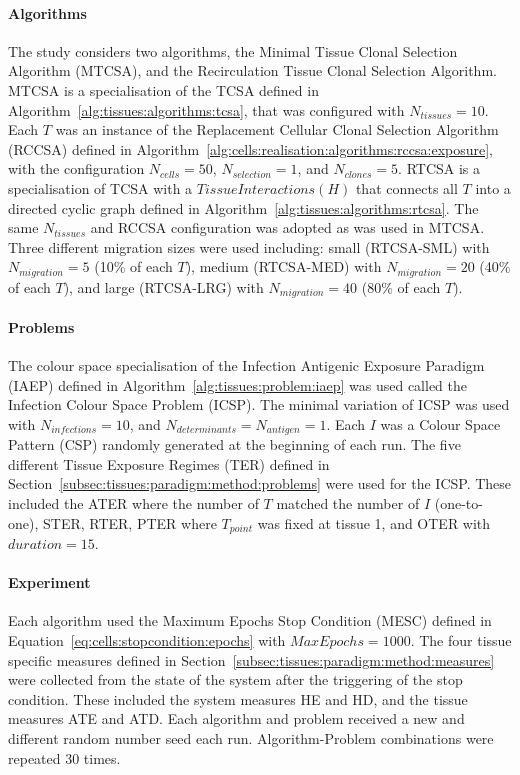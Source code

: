 \paragraph{Algorithms}
The study considers two algorithms, the Minimal Tissue Clonal Selection Algorithm (MTCSA), and the Recirculation Tissue Clonal Selection Algorithm. 
MTCSA is a specialisation of the TCSA defined in Algorithm~\ref{alg:tissues:algorithms:tcsa}, that was configured with $N_{tissues}=10$. Each $T$ was an instance of the Replacement Cellular Clonal Selection Algorithm (RCCSA) defined in Algorithm~\ref{alg:cells:realisation:algorithms:rccsa:exposure}, with the configuration $N_{cells}=50$, $N_{selection}=1$, and $N_{clones}=5$.
RTCSA is a specialisation of TCSA with a $TissueInteractions(H)$ that connects all $T$ into a directed cyclic graph defined in Algorithm~\ref{alg:tissues:algorithms:rtcsa}. The same $N_{tissues}$ and RCCSA configuration was adopted as was used in MTCSA. Three different migration sizes were used including: small (RTCSA-SML) with $N_{migration}=5$ (10\% of each $T$), medium (RTCSA-MED) with $N_{migration}=20$ (40\% of each $T$), and large (RTCSA-LRG) with $N_{migration}=40$ (80\% of each $T$). 

%
%
\paragraph{Problems}
The colour space specialisation of the Infection Antigenic Exposure Paradigm (IAEP) defined in Algorithm~\ref{alg:tissues:problem:iaep} was used called the Infection Colour Space Problem (ICSP). The minimal variation of ICSP was used with $N_{infections}=10$, and $N_{determinants} = N_{antigen} = 1$. Each $I$ was a Colour Space Pattern (CSP) randomly generated at the beginning of each run.
The five different Tissue Exposure Regimes (TER) defined in Section~\ref{subsec:tissues:paradigm:method:problems} were used for the ICSP. These included the ATER where the number of $T$ matched the number of $I$ (one-to-one), STER, RTER, PTER where $T_{point}$ was fixed at tissue 1, and OTER with $duration=15$.
	
%
%
\paragraph{Experiment}
Each algorithm used the Maximum Epochs Stop Condition (MESC) defined in Equation~\ref{eq:cells:stopcondition:epochs} with $MaxEpochs=1000$. The four tissue specific measures defined in Section~\ref{subsec:tissues:paradigm:method:measures} were collected from the state of the system after the triggering of the stop condition. These included the system measures HE and HD, and the tissue measures ATE and ATD. Each algorithm and problem received a new and different random number seed each run. Algorithm-Problem combinations were repeated 30 times.

